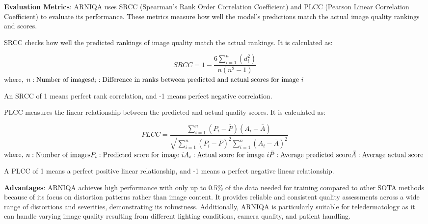 \vspace{\baselineskip}
\noindent
\textbf{Evaluation Metrics}: ARNIQA uses SRCC (Spearman’s Rank Order Correlation Coefficient) and PLCC (Pearson Linear Correlation Coefficient) to evaluate its performance. These metrics measure how well the model's predictions match the actual image quality rankings and scores. \par
\vspace{\baselineskip}
\noindent
SRCC checks how well the predicted rankings of image quality match the actual rankings. It is calculated as: \par
\begin{equation}
    SRCC = 1 - \frac{6 \sum_{i=1}^n (d_i^2)}{n(n^2 - 1)}
\end{equation}
\noindent
where, \newline
$n: \text{Number of images} \\ d_i: \text{Difference in ranks between predicted and actual scores for image } i$ \par
\vspace{\baselineskip}
\noindent
An SRCC of 1 means perfect rank correlation, and -1 means perfect negative correlation. \par
\vspace{\baselineskip}
\noindent
PLCC measures the linear relationship between the predicted and actual quality scores. It is calculated as: \par
\begin{equation}
    PLCC = \frac{\sum_{i=1}^n (P_i - \bar{P})(A_i - \bar{A})}{\sqrt{\sum_{i=1}^n (P_i - \bar{P})^2 \sum_{i=1}^n (A_i - \bar{A})^2}}
\end{equation}
\noindent
where, \newline
$n: \text{Number of images} \\ P_i: \text{Predicted score for image } i \\ A_i: \text{Actual score for image } i \\ \bar{P}: \text{Average predicted score} \\ \bar{A}: \text{Average actual score}$ \par
\vspace{\baselineskip}
\noindent
A PLCC of 1 means a perfect positive linear relationship, and -1 means a perfect negative linear relationship. \par
\vspace{\baselineskip}
\noindent
\textbf{Advantages}: ARNIQA achieves high performance with only up to 0.5\% of the data needed for training compared to other SOTA methods because of its focus on distortion patterns rather than image content. It provides reliable and consistent quality assessments across a wide range of distortions and severities, demonstrating its robustness. Additionally, ARNIQA is particularly suitable for teledermatology as it can handle varying image quality resulting from different lighting conditions, camera quality, and patient handling. \par

